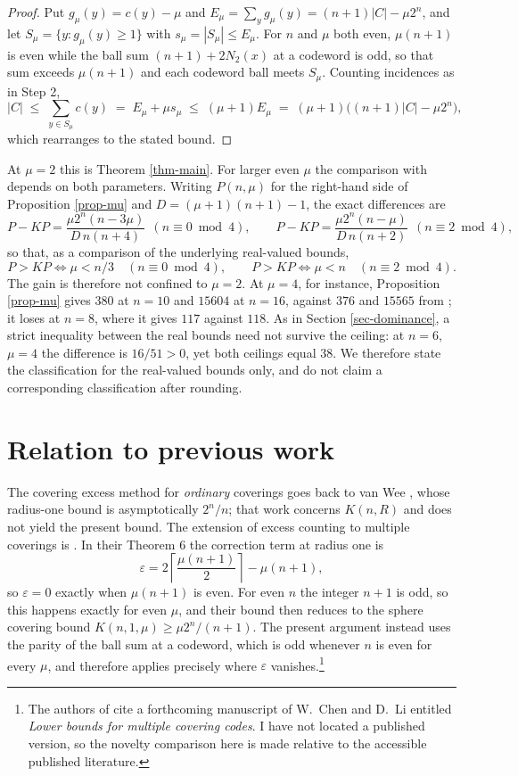 \documentclass[10pt,a4paper]{article}
\begin{document}
\begin{proof}
Put $g_\mu(y)=c(y)-\mu$ and $E_\mu=\sum_y g_\mu(y)=(n+1)|C|-\mu 2^n$, and let
$S_\mu=\{y:g_\mu(y)\ge 1\}$ with $s_\mu=|S_\mu|\le E_\mu$. For $n$ and $\mu$
both even, $\mu(n+1)$ is even while the ball sum $(n+1)+2N_2(x)$ at a codeword
is odd, so that sum exceeds $\mu(n+1)$ and each codeword ball meets $S_\mu$.
Counting incidences as in Step 2,
\[
  |C|\;\le\;\sum_{y\in S_\mu} c(y)\;=\;E_\mu+\mu s_\mu\;\le\;(\mu+1)E_\mu
      \;=\;(\mu+1)\bigl((n+1)|C|-\mu 2^n\bigr),
\]
which rearranges to the stated bound. \qedhere
\end{proof}

At $\mu=2$ this is Theorem \ref{thm-main}. For larger even $\mu$ the comparison
with \cite{KP-2021} depends on both parameters. Writing $P(n,\mu)$ for the
right-hand side of Proposition \ref{prop-mu} and $D=(\mu+1)(n+1)-1$, the exact
differences are
\[
  P-KP=\frac{\mu 2^n(n-3\mu)}{D\,n(n+4)}\ \ (n\equiv 0\bmod 4),
  \qquad
  P-KP=\frac{\mu 2^n(n-\mu)}{D\,n(n+2)}\ \ (n\equiv 2\bmod 4),
\]
so that, as a comparison of the underlying real-valued bounds,
\[
  P>KP \iff \mu<n/3 \quad (n\equiv 0\bmod 4),
  \qquad
  P>KP \iff \mu<n \quad (n\equiv 2\bmod 4).
\]
The gain is therefore not confined to $\mu=2$. At $\mu=4$, for instance,
Proposition \ref{prop-mu} gives $380$ at $n=10$ and $15604$ at $n=16$, against
$376$ and $15565$ from \cite{KP-2021}; it loses at $n=8$, where it gives $117$
against $118$. As in Section \ref{sec-dominance}, a strict inequality between
the real bounds need not survive the ceiling: at $n=6$, $\mu=4$ the difference
is $16/51>0$, yet both ceilings equal $38$. We therefore state the
classification for the real-valued bounds only, and do not claim a
corresponding classification after rounding.

\section{Relation to previous work}\label{sec-prior}

The covering excess method for \emph{ordinary} coverings goes back to van Wee
\cite{vanWee-1988}, whose radius-one bound is asymptotically $2^n/n$; that work
concerns $K(n,R)$ and does not yield the present bound. The extension of excess
counting to multiple coverings is \cite{HHKL-1993}. In their Theorem 6 the
correction term at radius one is
\[
  \varepsilon=2\left\lceil\frac{\mu(n+1)}{2}\right\rceil-\mu(n+1),
\]
so $\varepsilon=0$ exactly when $\mu(n+1)$ is even. For even $n$ the integer
$n+1$ is odd, so this happens exactly for even $\mu$, and their bound then
reduces to the sphere covering bound $K(n,1,\mu)\ge\mu 2^n/(n+1)$. The present
argument instead uses the parity of the ball sum at a codeword, which is odd
whenever $n$ is even for every $\mu$, and therefore applies precisely where
$\varepsilon$ vanishes.\footnote{The authors of \cite{HHKL-1993} cite a
forthcoming manuscript of W.\ Chen and D.\ Li entitled \emph{Lower bounds for
multiple covering codes}. I have not located a published version, so the
novelty comparison here is made relative to the accessible published
literature.}
\end{document}
